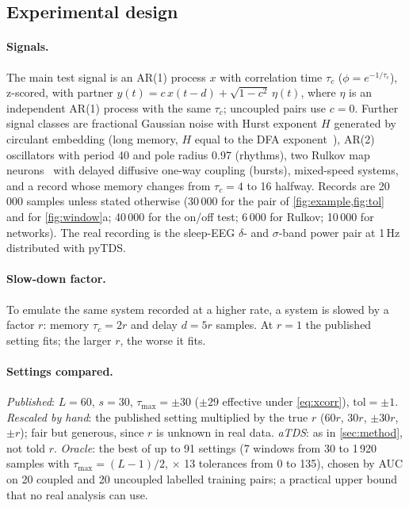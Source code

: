 \documentclass[11pt,a4paper]{article}
\begin{document}
\subsection{Experimental design}
\label{sec:design}
\paragraph{Signals.} The main test signal is an AR(1) process $x$ with correlation time $\tau_c$ ($\phi = e^{-1/\tau_c}$), z-scored, with partner $y(t) = c\, x(t-d) + \sqrt{1-c^2}\,\eta(t)$, where $\eta$ is an independent AR(1) process with the same $\tau_c$; uncoupled pairs use $c = 0$. Further signal classes are fractional Gaussian noise with Hurst exponent $H$ generated by circulant embedding (long memory, $H$ equal to the DFA exponent~\cite{Peng1995QuantificationScaling}), AR(2) oscillators with period 40 and pole radius 0.97 (rhythms), two Rulkov map neurons~\cite{Rulkov2002ModelingSpikingbursting} with delayed diffusive one-way coupling (bursts), mixed-speed systems, and a record whose memory changes from $\tau_c = 4$ to 16 halfway. Records are 20\,000 samples unless stated otherwise (30\,000 for the pair of \cref{fig:example,fig:tol} and for \cref{fig:window}a; 40\,000 for the on/off test; 6\,000 for Rulkov; 10\,000 for networks). The real recording is the sleep-EEG $\delta$- and $\sigma$-band power pair at 1\,Hz distributed with pyTDS.

\paragraph{Slow-down factor.} To emulate the same system recorded at a higher rate, a system is slowed by a factor $r$: memory $\tau_c = 2r$ and delay $d = 5r$ samples. At $r = 1$ the published setting fits; the larger $r$, the worse it fits.

\paragraph{Settings compared.} \emph{Published}: $L = 60$, $s = 30$, $\tau_{\max} = \pm30$ ($\pm29$ effective under \cref{eq:xcorr}), $\mathrm{tol} = \pm1$. \emph{Rescaled by hand}: the published setting multiplied by the true $r$ ($60r$, $30r$, $\pm30r$, $\pm r$); fair but generous, since $r$ is unknown in real data. \emph{aTDS}: as in \cref{sec:method}, not told $r$. \emph{Oracle}: the best of up to 91 settings (7 windows from 30 to 1\,920 samples with $\tau_{\max} = (L-1)/2$, $\times$ 13 tolerances from 0 to 135), chosen by AUC on 20 coupled and 20 uncoupled labelled training pairs; a practical upper bound that no real analysis can use.
\end{document}
